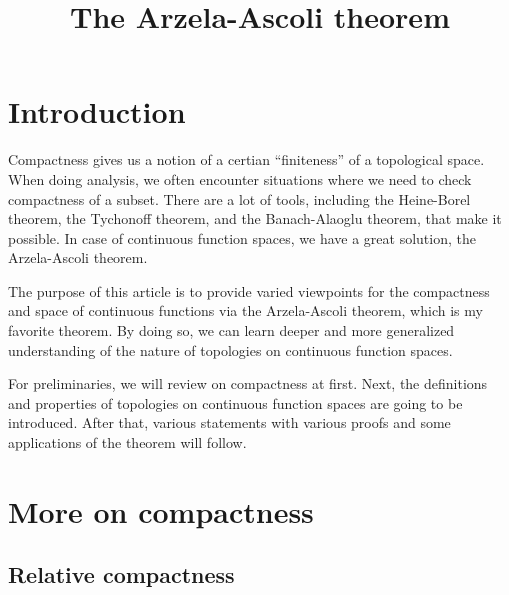 \documentclass{../exp}
\title{The Arzela-Ascoli theorem}
\begin{document}
\maketitle

\section{Introduction}
Compactness gives us a notion of a certian ``finiteness'' of a topological space.
When doing analysis, we often encounter situations where we need to check compactness of a subset.
There are a lot of tools, including the Heine-Borel theorem, the Tychonoff theorem, and the Banach-Alaoglu theorem, that make it possible.
In case of continuous function spaces, we have a great solution, the Arzela-Ascoli theorem.

The purpose of this article is to provide varied viewpoints for the compactness and space of continuous functions via the Arzela-Ascoli theorem, which is my favorite theorem.
By doing so, we can learn deeper and more generalized understanding of the nature of topologies on continuous function spaces.

For preliminaries, we will review on compactness at first.
Next, the definitions and properties of topologies on continuous function spaces are going to be introduced.
After that, various statements with various proofs and some applications of the theorem will follow.






\section{More on compactness}

\subsection{Relative compactness}
\end{document}
